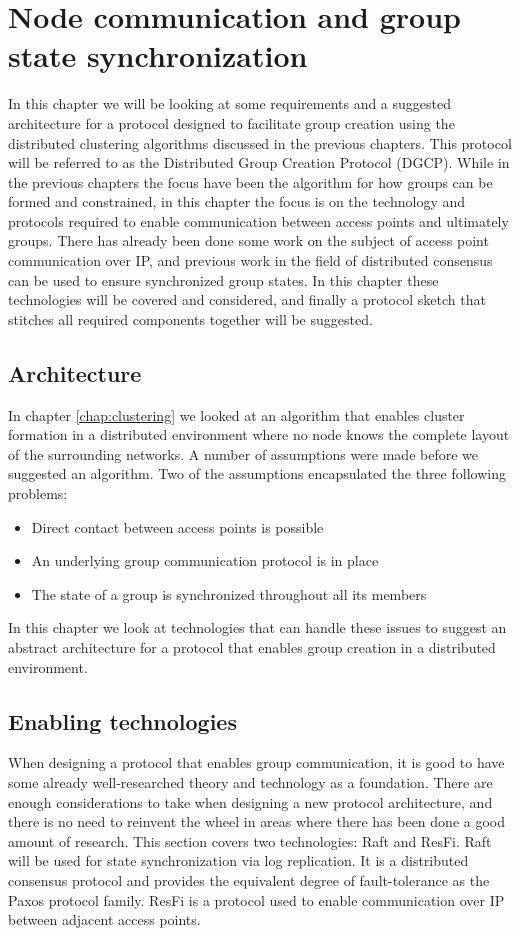 \chapter{Node communication and group state synchronization}
\label{chap:proto}
In this chapter we will be looking at some requirements and a suggested architecture for a protocol designed to facilitate group creation using the
distributed clustering algorithms discussed in the previous chapters. This protocol will be referred to as the Distributed Group Creation Protocol (DGCP).
While in the previous chapters the focus have been the algorithm for how groups can be formed and constrained, in this chapter the focus is on the technology and protocols required
to enable communication between access points and ultimately groups. There has already been done some work on the subject of access point communication over IP,
and previous work in the field of distributed consensus can be used to ensure synchronized group states. In this chapter these technologies will be covered and considered,
and finally a protocol sketch that stitches all required components together will be suggested. 


\section{Architecture}
In chapter \ref{chap:clustering} we looked at an algorithm that enables cluster formation in a distributed environment where no node knows the complete layout of the surrounding networks.
A number of assumptions were made before we suggested an algorithm. Two of the assumptions encapsulated the three following problems:
\begin{itemize}
\item Direct contact between access points is possible
\item An underlying group communication protocol is in place
\item The state of a group is synchronized throughout all its members
\end{itemize}
In this chapter we look at technologies that can handle these issues to suggest an abstract architecture for a protocol that enables group creation in a distributed environment.

\section{Enabling technologies}
When designing a protocol that enables group communication, it is good to have some already well-researched theory and technology as a foundation. There are enough
considerations to take when designing a new protocol architecture, and there is no need to reinvent the wheel in areas where there has been done a good amount of research. 
This section covers two technologies: Raft and ResFi. Raft will be used for state synchronization via log replication. It is a distributed consensus protocol and provides the equivalent degree of fault-tolerance as the Paxos \cite{lamport2001paxos} protocol family. ResFi is a protocol used to enable communication over IP between adjacent access points. 

